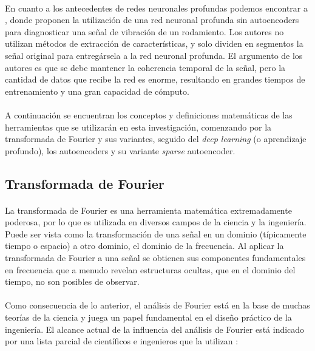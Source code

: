 \documentclass[12pt]{article}%
\begin{document}
\paragraph{}
En cuanto a los antecedentes de redes neuronales profundas podemos encontrar a \cite{ran}, donde proponen la utilización de una red neuronal profunda sin autoencoders para diagnosticar una señal de vibración de un rodamiento. Los autores no utilizan métodos de extracción de características, y solo dividen en segmentos la señal original para entregársela a la red neuronal profunda. El argumento de los autores es que se debe mantener la coherencia temporal de la señal, pero la cantidad de datos que recibe la red es enorme, resultando en grandes tiempos de entrenamiento y una gran capacidad de cómputo.

\paragraph{}
A continuación se encuentran los conceptos y definiciones matemáticas de las herramientas que se utilizarán en esta investigación, comenzando por la transformada de Fourier y sus variantes, seguido del \textit{deep learning} (o aprendizaje profundo), los autoencoders y su variante \textit{sparse} autoencoder.

\subsection{Transformada de Fourier}
\paragraph{}
La transformada de Fourier es una herramienta matemática extremadamente poderosa, por lo que es utilizada en diversos campos de la ciencia y la ingeniería. Puede ser vista como la transformación de una señal en un dominio (típicamente tiempo o espacio) a otro dominio, el dominio de la frecuencia. Al aplicar la transformada de Fourier a una señal se obtienen sus componentes fundamentales en frecuencia que a menudo revelan estructuras ocultas, que en el dominio del tiempo, no son posibles de observar.

\paragraph{}
Como consecuencia de lo anterior, el análisis de Fourier está en la base de muchas teorías de la ciencia y juega un papel fundamental en el diseño práctico de la ingeniería. El alcance actual de la influencia del análisis de Fourier está indicado por una lista parcial de científicos e ingenieros que la utilizan \cite{robert}:
\end{document}
